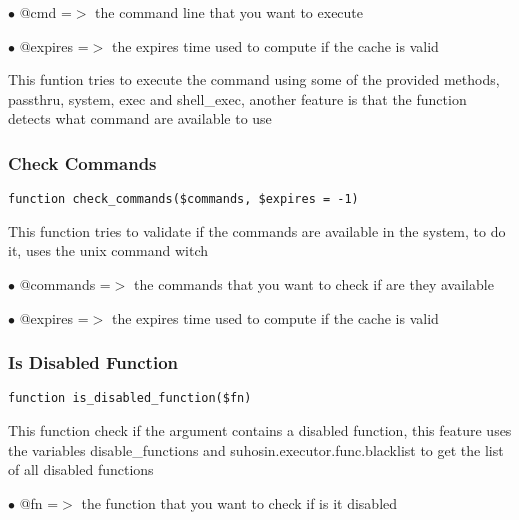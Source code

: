 \documentclass[a4paper]{article}
\begin{document}
\begin{compactitem}
\item[\color{myblue}$\bullet$] @cmd     =$>$ the command line that you want to execute
\item[\color{myblue}$\bullet$] @expires =$>$ the expires time used to compute if the cache is valid
\end{compactitem}

This funtion tries to execute the command using some of the
provided methods, passthru, system, exec and shell\_exec, another
feature is that the function detects what command are available
to use

\hypertarget{toc125}{}
\subsubsection{Check Commands}

\begin{lstlisting}
function check_commands($commands, $expires = -1)
\end{lstlisting}

This function tries to validate if the commands are available
in the system, to do it, uses the unix command witch

\begin{compactitem}
\item[\color{myblue}$\bullet$] @commands =$>$ the commands that you want to check if are they available
\item[\color{myblue}$\bullet$] @expires  =$>$ the expires time used to compute if the cache is valid
\end{compactitem}

\hypertarget{toc126}{}
\subsubsection{Is Disabled Function}

\begin{lstlisting}
function is_disabled_function($fn)
\end{lstlisting}

This function check if the argument contains a disabled
function, this feature uses the variables disable\_functions
and suhosin.executor.func.blacklist to get the list of all
disabled functions

\begin{compactitem}
\item[\color{myblue}$\bullet$] @fn =$>$ the function that you want to check if is it disabled
\end{compactitem}
\end{document}
